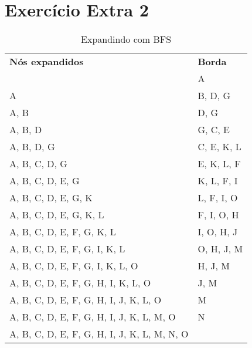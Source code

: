 \documentclass[12pt,letterpaper]{article}
\begin{document}
	\section*{Exercício Extra 2}
	
	\newpage
	
	\begin{table}[]
		\centering
		\caption{Expandindo com BFS}
		\label{my-label}
		\begin{tabular}{l|l}
			\textbf{Nós expandidos}                      & \textbf{Borda} \\ \cline{1-2}
			                                             & A              \\ \cline{1-2}
			A                                            & B, D, G        \\ \cline{1-2}
			A, B                                         & D, G           \\ \cline{1-2}
			A, B, D                                      & G, C, E        \\ \cline{1-2}
			A, B, D, G                                   & C, E, K, L     \\ \cline{1-2}
			A, B, C, D, G                                & E, K, L, F     \\ \cline{1-2}
			A, B, C, D, E, G                             & K, L, F, I     \\ \cline{1-2}
			A, B, C, D, E, G, K                          & L, F, I, O     \\ \cline{1-2}
			A, B, C, D, E, G, K, L                       & F, I, O, H     \\ \cline{1-2}
			A, B, C, D, E, F, G, K, L                    & I, O, H, J     \\ \cline{1-2}
			A, B, C, D, E, F, G, I, K, L                 & O, H, J, M     \\ \cline{1-2}
			A, B, C, D, E, F, G, I, K, L, O              & H, J, M        \\ \cline{1-2}
			A, B, C, D, E, F, G, H, I, K, L, O           & J, M           \\ \cline{1-2}
			A, B, C, D, E, F, G, H, I, J, K, L, O        & M              \\ \cline{1-2}
			A, B, C, D, E, F, G, H, I, J, K, L, M, O     & N              \\ \cline{1-2}
			A, B, C, D, E, F, G, H, I, J, K, L, M, N, O  &                \\
		\end{tabular}
	\end{table}
\end{document}
